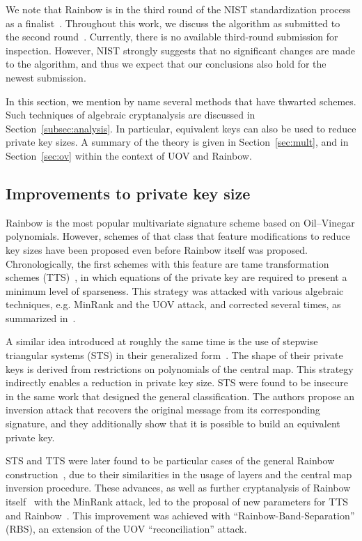 \documentclass[12pt, a4paper, oneside]{memoir}
\theoremstyle{definition}
\begin{document}
We note that Rainbow is in the third round of the NIST standardization process as a finalist~\cite[Sec.~3.20]{Alagic:202007}. Throughout this work, we discuss the algorithm as submitted to the second round~\cite{Ding:201901}. Currently, there is no available third-round submission for inspection. However, NIST strongly suggests that no significant changes are made to the algorithm, and thus we expect that our conclusions also hold for the newest submission.

In this section, we mention by name several methods that have thwarted schemes. Such techniques of algebraic cryptanalysis are discussed in Section~\ref{subsec:analysis}. In particular, equivalent keys can also be used to reduce private key sizes. A summary of the theory is given in Section~\ref{sec:mult}, and in Section~\ref{sec:ov} within the context of UOV and Rainbow.

\subsection{Improvements to private key size}\label{subsec:priv}

Rainbow is the most popular multivariate signature scheme based on Oil--Vinegar polynomials. However, schemes of that class that feature modifications to reduce key sizes have been proposed even before Rainbow itself was proposed. Chronologically, the first schemes with this feature are tame transformation schemes (TTS)~\cite{Chen:200210}, in which equations of the private key are required to present a minimum level of sparseness. This strategy was attacked with various algebraic techniques, e.g. MinRank and the UOV attack, and corrected several times, as summarized in~\cite{Ding:200604}.

A similar idea introduced at roughly the same time is the use of stepwise triangular systems (STS) in their generalized form~\cite{Wolf:200603}. The shape of their private keys is derived from restrictions on polynomials of the central map. This strategy indirectly enables a reduction in private key size. STS were found to be insecure in the same work that designed the general classification. The authors propose an inversion attack that recovers the original message from its corresponding signature, and they additionally show that it is possible to build an equivalent private key.

STS and TTS were later found to be particular cases of the general Rainbow construction~\cite{Ding:200806}, due to their similarities in the usage of layers and the central map inversion procedure. These advances, as well as further cryptanalysis of Rainbow itself~\cite{Billet:200609} with the MinRank attack, led to the proposal of new parameters for TTS and Rainbow~\cite{Ding:200806}. This improvement was achieved with ``Rainbow-Band-Separation'' (RBS), an extension of the UOV ``reconciliation'' attack.
\end{document}
